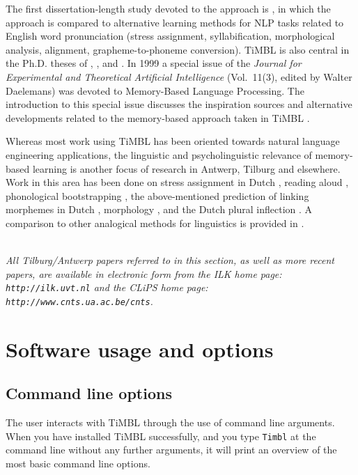 \documentclass{report}
\begin{document}
The first dissertation-length study devoted to the approach is \cite{VandenBosch97}, in which the approach is compared to alternative learning methods for NLP tasks related to English word pronunciation (stress assignment, syllabification, morphological analysis, alignment, grapheme-to-phoneme conversion). TiMBL is also central in the Ph.D. theses of , , and . In 1999 a special issue of the {\em Journal for Experimental and Theoretical Artificial Intelligence} (Vol.~11(3), edited by Walter Daelemans) was devoted to Memory-Based Language Processing. The introduction to this special issue discusses the inspiration sources and alternative developments related to the memory-based approach taken in TiMBL \cite{Daelemans99b}.

Whereas most work using TiMBL has been oriented towards natural language engineering applications, the linguistic and psycholinguistic relevance of memory-based learning is another focus of research in Antwerp, Tilburg and elsewhere. Work in this area has been done on stress assignment in Dutch \cite{Daelemans+94,Gillis+00}, reading aloud \cite{VandenBosch+00b}, phonological bootstrapping \cite{Durieux+00}, the above-mentioned prediction of linking morphemes in Dutch \cite{Krott+01}, morphology \cite{Eddington00,Eddington03}, and the Dutch plural inflection \cite{Keuleers+07}. A comparison to other analogical methods for linguistics is provided in \cite{Daelemans+97f}.

\ \\

{\it All Tilburg/Antwerp papers referred to in this section, as well
as more recent papers, are available in electronic form from the {\sc
ILK} home page: {\tt http://ilk.uvt.nl} and the {\sc CLiPS} home page: \\
{\tt http://www.cnts.ua.ac.be/cnts}.}

\chapter{Software usage and options}
\label{reference}

\section{Command line options}
\label{commandline}

The user interacts with TiMBL through the use of command line arguments.
When you have installed TiMBL successfully, and you type {\tt Timbl} at the
command line without any further arguments, it will print an overview
of the most basic command line options. 
\end{document}
